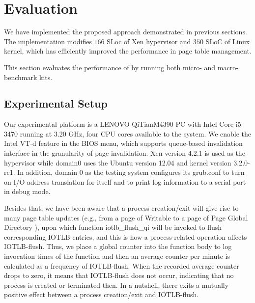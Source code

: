 
\section{Evaluation} \label{sec:eva}

We have implemented the proposed approach demonstrated in previous sections. The implementation modifies %
$166$ SLoc of Xen hypervisor and $350$ SLoC of Linux kernel, which has efficiently improved the performance in page table management.

This section evaluates the performance of \name by running both micro- and macro-benchmark kits.

\subsection{Experimental Setup}

Our experimental platform is a LENOVO QiTianM4390 PC with Intel Core i5-3470 running at 3.20 GHz, four CPU cores available to the system. We enable the Intel VT-d feature in the BIOS menu, which supports queue-based invalidation interface in the granularity of page invalidation. Xen version 4.2.1 is used as the hypervisor while domain0 uses the Ubuntu version 12.04 and kernel version 3.2.0-rc1. In addition, domain 0 as the testing system configures its grub.conf to turn on I/O address translation for itself and to print log information to a serial port in debug mode.

Besides that, we have been aware that a process creation/exit will give rise to many page table updates (e.g., from a page of Writable to a page of Page Global Directory ), upon which function iotlb\_flush\_qi will be invoked to flush corresponding IOTLB entries, and this is how a process-related operation affects IOTLB-flush. Thus, we place a global counter into the function body to log invocation times of the function and then an average counter per minute is calculated as a frequency of IOTLB-flush. When the recorded average counter drops to zero, it means that IOTLB-flush does not occur, indicating that no process is created or terminated then. In a nutshell, there exits a mutually positive effect between a process creation/exit and IOTLB-flush.

